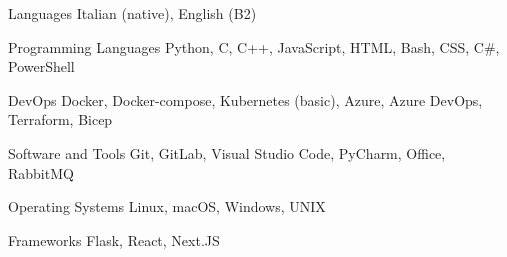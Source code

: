 \cvskill
{Languages} %
{Italian (native), English (B2)}




\begin{cvskills}


\cvskill
{Programming Languages} %
{Python, C, C++, JavaScript, HTML, Bash, CSS, C#, PowerShell} %


\cvskill
{DevOps} %
{Docker, Docker-compose, Kubernetes (basic), Azure, Azure DevOps, Terraform, Bicep} %


\cvskill
{Software and Tools} %
{Git, GitLab, Visual Studio Code, PyCharm, Office, RabbitMQ} %


\cvskill
{Operating Systems} %
{Linux, macOS, Windows, UNIX} %


\cvskill
{Frameworks} %
{Flask, React, Next.JS} %




\end{cvskills}
